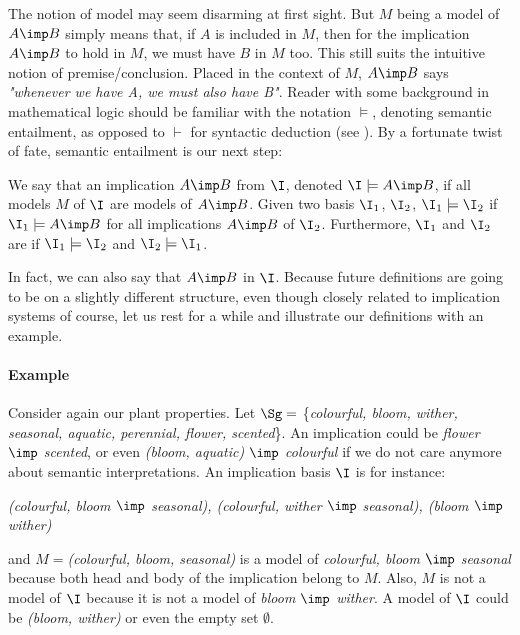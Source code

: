 \noindent The notion of model may seem disarming at first sight. But $M$ being
a model of $A \imp B$ simply means that, if $A$ is included in $M$, then for
the implication $A \imp B$ to hold in $M$, we must have $B$ in $M$ too. This 
still suits the intuitive notion of premise/conclusion. Placed in the context
of $M$, $A \imp B$ says \textit{"whenever we have A, we must also have B"}.
Reader with some background in mathematical logic should be familiar with the
notation $\models$, denoting semantic entailment, as opposed to $\vdash$ for
syntactic deduction (see \cite{cori_mathematical_2000}). By a fortunate twist of
fate, semantic entailment is our next step:

\begin{definition} We say that an implication 
$A \imp B$  from $\I$, denoted $\I \models A 
\imp B$, if all models $M$ of $\I$ are models of $A \imp B$. Given two basis $\I_1$, $\I_2$, $\I_1 \models \I_2$ if $\I_1 \models A \imp B$ for all
implications $A \imp B$ of $\I_2$. Furthermore, $\I_1$ and $\I_2$ are  if $\I_1 \models \I_2$ and $\I_2 \models \I_1$.  
	
\end{definition} 

\noindent In fact, we can also say that $A \imp B$  in $\I$. Because future definitions are going to be on a slightly different 
structure, even though closely related to implication systems of course, let us
rest for a while and illustrate our definitions with an example.


\paragraph{Example} Consider again our plant properties. Let $\Sg = $ 
\{\textit{colourful, bloom, wither, seasonal, aquatic, perennial, flower, 
	scented}\}. An implication could be \textit{flower $\imp$ scented}, or even
\textit{(bloom, aquatic) $\imp$ colourful} if we do not care anymore about semantic interpretations. An implication basis $\I$ is for instance:

\begin{center}
	\textit{(colourful, bloom $\imp$ seasonal), (colourful, wither $\imp$ 
		seasonal), (bloom $\imp$ wither)}
\end{center}

\noindent and $M = $\textit{(colourful, bloom, seasonal)} is a model of 
\textit{colourful, bloom $\imp$ seasonal} because both head and body
of the implication belong to $M$. Also, $M$ is not a model of $\I$ because it
is not a model of \textit{bloom $\imp$ wither}. A model of $\I$ could be 
\textit{(bloom, wither)} or even the empty set $\emptyset$.

